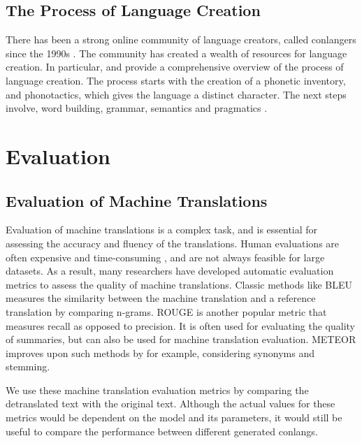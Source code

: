 \subsection{The Process of Language Creation}

There has been a strong online community of language creators, called conlangers since the 1990s \cite{petersonArtLanguageInvention2015}. 
The community has created a wealth of resources for language creation. In particular, \cite{petersonArtLanguageInvention2015} and \cite{rosenfelder2010language} provide 
a comprehensive overview of the process of language creation. The process starts with the creation of a phonetic inventory, and phonotactics, which gives the language a distinct
character. The next steps involve, word building, grammar, semantics and pragmatics \cite{rosenfelder2010language}.

\section{Evaluation}
\subsection{Evaluation of Machine Translations}
Evaluation of machine translations is a complex task, and is essential for assessing the accuracy and fluency of the translations. Human evaluations
are often expensive and time-consuming \cite{papineniBLEUMethodAutomatic2002}, and are not always feasible for large datasets. As a result, many researchers 
have developed automatic evaluation metrics to assess the quality of machine translations. Classic methods like BLEU \cite{papineniBLEUMethodAutomatic2002} measures
the similarity between the machine translation and a reference translation by comparing n-grams. ROUGE \cite{linROUGEPackageAutomatic2004} is another popular metric that
measures recall as opposed to precision. It is often used for evaluating the quality of summaries, but can also be used for machine translation evaluation. METEOR \cite{banerjeeMETEORAutomaticMetric2005} 
improves upon such methods by for example, considering synonyms and stemming. 

We use these machine translation evaluation metrics by comparing the detranslated text with the original text. Although the actual values for these metrics would be
dependent on the model and its parameters, it would still be useful to compare the performance between different generated conlangs. 

